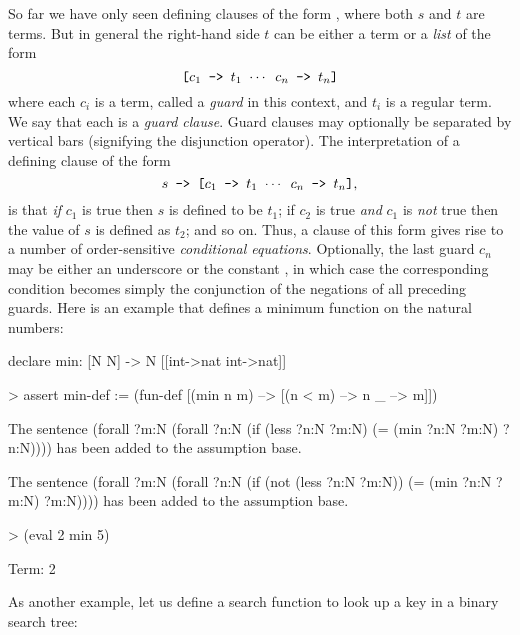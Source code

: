 So far we have only seen defining clauses of the form ,
where both $s$ and $t$ are terms. But in general the right-hand side
$t$ can be either a term or a {\em list\/} of the form 
$$\mbox{\tt [$c_1$ --> $t_1$ $\cdots$ $c_n$ --> $t_n$]}$$
where each $c_i$ is a  term, called a {\em guard\/}
in this context, and $t_i$ is a regular term. We say that each 
 is a {\em guard clause}. Guard clauses
may optionally be separated by vertical bars (signifying 
the disjunction operator).  The interpretation
of a defining clause of the form 
$$\mbox{\tt $s$ --> [$c_1$ --> $t_1$ $\cdots$ $c_n$ --> $t_n$]},$$
is that {\em if\/} $c_1$ is true then $s$ is defined to be $t_1$;
if $c_2$ is true {\em and\/} $c_1$ is {\em not\/} true then 
the value of $s$ is defined as $t_2$; and
so on. Thus, a clause of this form gives rise to a number of order-sensitive 
{\em conditional equations}. Optionally, the last guard $c_n$
may be either an underscore or the constant , in which
case the corresponding condition becomes simply the conjunction
of the negations of all preceding guards. 
Here is an example that defines a minimum function on the 
natural numbers: 
\begin{tcAthena}
declare min: [N N] -> N [[int->nat int->nat]]

> assert min-def :=
    (fun-def [(min n m) --> [(n < m) --> n
                             _ --> m]])

The sentence 
(forall ?m:N
  (forall ?n:N
    (if (less ?n:N ?m:N)
        (= (min ?n:N ?m:N)
           ?n:N))))
has been added to the assumption base.

The sentence 
(forall ?m:N
  (forall ?n:N
    (if (not (less ?n:N ?m:N))
        (= (min ?n:N ?m:N)
           ?m:N))))
has been added to the assumption base.

> (eval 2 min 5)

Term: 2
\end{tcAthena}
As another example, let us define a search function to look up a key in 
a binary search tree:
